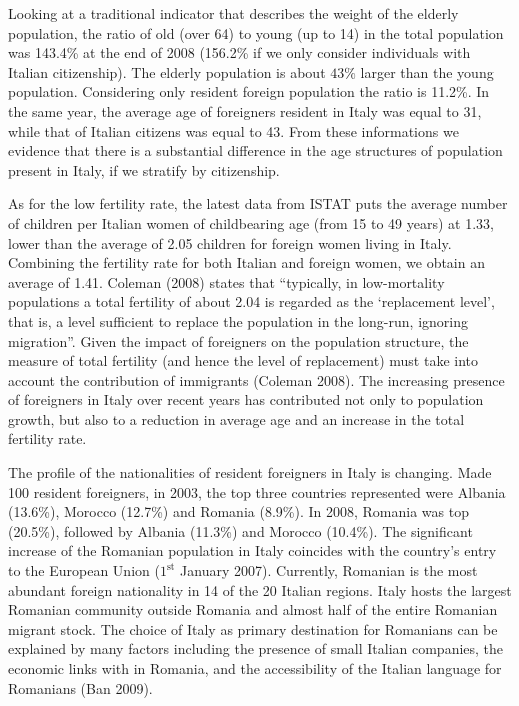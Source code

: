 \documentclass[10pt]{article}
\theoremstyle{definition}
\theoremstyle{plain}
\begin{document}
Looking at a traditional indicator that describes the weight of the elderly population, the ratio of old (over 64) to young (up to 14) in the total population was 143.4\% at the end of 2008 (156.2\% if we only consider individuals with Italian citizenship). The elderly population is about $43\%$ larger than the young population. Considering only resident foreign population the ratio is 11.2\%. In the same year, the average age of foreigners resident in Italy was equal to 31, while that of Italian citizens was equal to 43. From these informations we evidence that there is a substantial difference in the age structures of population present in Italy, if we stratify by citizenship.

As for the low fertility rate, the latest data from ISTAT puts the average number of children per Italian women of childbearing age (from 15 to 49 years) at 1.33, lower than the average of 2.05 children for foreign women living in Italy. Combining the fertility rate for both Italian and foreign women, we obtain an average of 1.41. Coleman (2008) states that ``typically, in low-mortality populations a total fertility of about 2.04 is regarded as the `replacement level', that is, a level sufficient to replace the population in the long-run, ignoring migration''. Given the impact of foreigners on the population structure, the measure of total fertility (and hence the level of replacement) must take into account the contribution of immigrants (Coleman 2008). The increasing presence of foreigners in Italy over recent years has contributed not only to population growth, but also to a reduction in average age and an increase in the total fertility rate.

The profile of the nationalities of resident foreigners in Italy is changing. Made 100 resident foreigners, in 2003, the top three countries represented were Albania (13.6\%), Morocco (12.7\%) and Romania (8.9\%). In 2008, Romania was top (20.5\%), followed by Albania (11.3\%) and Morocco (10.4\%). The significant increase of the Romanian population in Italy coincides with the country's entry to the European Union ($1^\text{st}$ January 2007). Currently, Romanian is the most abundant foreign nationality in 14 of the 20 Italian regions. Italy hosts the largest Romanian community outside Romania and almost half of the entire Romanian migrant stock. The choice of Italy as primary destination for Romanians can be explained by many factors including the presence of small Italian companies, the economic links with in Romania, and the accessibility of the Italian language for Romanians (Ban 2009). 
\end{document}
